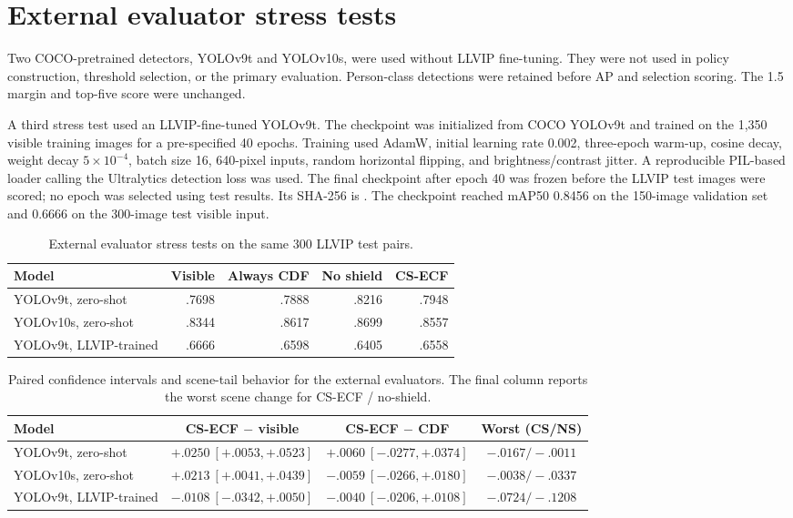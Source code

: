 \documentclass[11pt]{article}
\begin{document}
\section{External evaluator stress tests}

Two COCO-pretrained detectors, YOLOv9t and YOLOv10s, were used without LLVIP
fine-tuning. They were not used in policy construction, threshold selection, or
the primary evaluation. Person-class detections were retained before AP and
selection scoring. The 1.5 margin and top-five score were unchanged.

A third stress test used an LLVIP-fine-tuned YOLOv9t. The checkpoint was
initialized from COCO YOLOv9t and trained on the 1,350 visible training images
for a pre-specified 40 epochs. Training used AdamW, initial learning rate
0.002, three-epoch warm-up, cosine decay, weight decay \(5\times10^{-4}\), batch
size 16, 640-pixel inputs, random horizontal flipping, and
brightness/contrast jitter. A reproducible PIL-based loader calling the
Ultralytics detection loss was used. The final checkpoint after epoch 40 was
frozen before the LLVIP test images were scored; no epoch was selected using
test results. Its SHA-256 is
\texttt{}.
The checkpoint reached mAP50 0.8456 on the 150-image validation set and 0.6666
on the 300-image test visible input.

\begin{table}[ht]
\centering
\small
\caption{External evaluator stress tests on the same 300 LLVIP test pairs.}
\begin{tabular}{@{}lrrrr@{}}
\toprule
Model & Visible & Always CDF & No shield & CS-ECF \\
\midrule
YOLOv9t, zero-shot & .7698 & .7888 & .8216 & .7948 \\
YOLOv10s, zero-shot & .8344 & .8617 & .8699 & .8557 \\
YOLOv9t, LLVIP-trained & .6666 & .6598 & .6405 & .6558 \\
\bottomrule
\end{tabular}
\end{table}

\begin{table}[ht]
\centering
\scriptsize
\setlength{\tabcolsep}{3pt}
\caption{Paired confidence intervals and scene-tail behavior for the external
evaluators. The final column reports the worst scene change for CS-ECF /
no-shield.}
\begin{tabular}{@{}lccc@{}}
\toprule
Model & CS-ECF \(-\) visible & CS-ECF \(-\) CDF & Worst (CS/NS) \\
\midrule
YOLOv9t, zero-shot & \(+.0250~[+.0053,+.0523]\) &
  \(+.0060~[-.0277,+.0374]\) & \(-.0167 / -.0011\) \\
YOLOv10s, zero-shot & \(+.0213~[+.0041,+.0439]\) &
  \(-.0059~[-.0266,+.0180]\) & \(-.0038 / -.0337\) \\
YOLOv9t, LLVIP-trained & \(-.0108~[-.0342,+.0050]\) &
  \(-.0040~[-.0206,+.0108]\) & \(-.0724 / -.1208\) \\
\bottomrule
\end{tabular}
\end{table}
\end{document}
